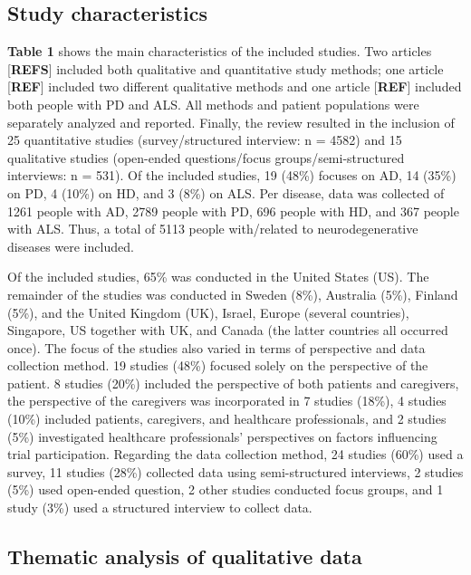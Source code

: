 \documentclass[preprint, 3p,
authoryear]{elsarticle} %
\begin{document}
\hypertarget{study-characteristics}{%
\subsection{Study characteristics}\label{study-characteristics}}

\textbf{Table 1} shows the main characteristics of the included studies.
Two articles {[}\textbf{REFS}{]} included both qualitative and
quantitative study methods; one article {[}\textbf{REF}{]} included two
different qualitative methods and one article {[}\textbf{REF}{]}
included both people with PD and ALS. All methods and patient
populations were separately analyzed and reported. Finally, the review
resulted in the inclusion of 25 quantitative studies (survey/structured
interview: n = 4582) and 15 qualitative studies (open-ended
questions/focus groups/semi-structured interviews: n = 531). Of the
included studies, 19 (48\%) focuses on AD, 14 (35\%) on PD, 4 (10\%) on
HD, and 3 (8\%) on ALS. Per disease, data was collected of 1261 people
with AD, 2789 people with PD, 696 people with HD, and 367 people with
ALS. Thus, a total of 5113 people with/related to neurodegenerative
diseases were included.

Of the included studies, 65\% was conducted in the United States (US).
The remainder of the studies was conducted in Sweden (8\%), Australia
(5\%), Finland (5\%), and the United Kingdom (UK), Israel, Europe
(several countries), Singapore, US together with UK, and Canada (the
latter countries all occurred once). The focus of the studies also
varied in terms of perspective and data collection method. 19 studies
(48\%) focused solely on the perspective of the patient. 8 studies
(20\%) included the perspective of both patients and caregivers, the
perspective of the caregivers was incorporated in 7 studies (18\%), 4
studies (10\%) included patients, caregivers, and healthcare
professionals, and 2 studies (5\%) investigated healthcare
professionals' perspectives on factors influencing trial participation.
Regarding the data collection method, 24 studies (60\%) used a survey,
11 studies (28\%) collected data using semi-structured interviews, 2
studies (5\%) used open-ended question, 2 other studies conducted focus
groups, and 1 study (3\%) used a structured interview to collect data.

\hypertarget{thematic-analysis-of-qualitative-data}{%
\subsection{Thematic analysis of qualitative
data}\label{thematic-analysis-of-qualitative-data}}
\end{document}

